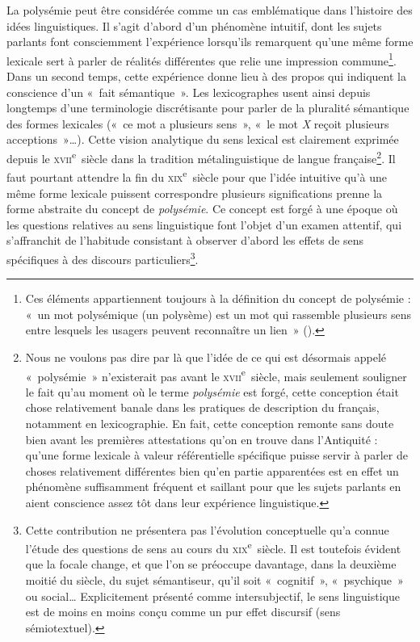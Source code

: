 \documentclass[output=paper]{langsci/langscibook}
\begin{document}
La polysémie peut être considérée comme un cas emblématique dans l’histoire des idées linguistiques. Il s’agit d’abord d’un phénomène intuitif, dont les sujets parlants font consciemment l’expérience lorsqu’ils remarquent qu’une même forme lexicale sert à parler de réalités différentes que relie une impression commune\footnote{ \textrm{Ces éléments appartiennent toujours à la définition du concept de polysémie : «~un mot polysémique (un polysème) est un mot qui rassemble plusieurs sens entre lesquels les usagers peuvent reconnaître un lien~» (\citealt[94]{nyckees_semantique_1998}).}}. Dans un second temps, cette expérience donne lieu à des propos qui indiquent la conscience d’un «~fait sémantique~». Les lexicographes usent ainsi depuis longtemps d’une terminologie discrétisante pour parler de la pluralité sémantique des formes lexicales («~ce mot a plusieurs sens~», «~le mot \textit{X} reçoit plusieurs acceptions~»…). Cette vision analytique du sens lexical est clairement exprimée depuis le \textsc{xvii}\textsuperscript{e}~siècle dans la tradition métalinguistique de langue française\footnote{ \textrm{Nous ne voulons pas dire par là que l’idée de ce qui est désormais appelé «~polysémie~» n’existerait pas avant le} \textrm{\textsc{xvii}}\textrm{\textsuperscript{e}}\textrm{~siècle, mais seulement souligner le fait qu’au moment où le terme} \textrm{\textit{polysémie}} \textrm{est forgé, cette conception était chose relativement banale dans les pratiques de description du français, notamment en lexicographie. En fait, cette conception remonte sans doute bien avant les premières attestations qu’on en trouve dans l’Antiquité : qu’une forme lexicale à valeur référentielle spécifique puisse servir à parler de choses relativement différentes bien qu’en partie apparentées est en effet un phénomène suffisamment fréquent et saillant pour que les sujets parlants en aient conscience assez tôt dans leur expérience linguistique.}}. Il faut pourtant attendre la fin du \textsc{xix}\textsuperscript{e}~siècle pour que l’idée intuitive qu’à une même forme lexicale puissent correspondre plusieurs significations prenne la forme abstraite du concept de \textit{polysémie}. Ce concept est forgé à une époque où les questions relatives au sens linguistique font l’objet d’un examen attentif, qui s’affranchit de l’habitude consistant à observer d’abord les effets de sens spécifiques à des discours particuliers\footnote{ \textrm{Cette contribution ne présentera pas l’évolution conceptuelle qu’a connue l’étude des questions de sens au cours du} \textrm{\textsc{xix}}\textrm{\textsuperscript{e}}\textrm{~siècle. Il est toutefois évident que la focale change, et que l’on se préoccupe davantage, dans la deuxième moitié du siècle, du sujet sémantiseur, qu’il soit «~cognitif~», «~psychique~» ou social… Explicitement présenté comme intersubjectif, le sens linguistique est de moins en moins conçu comme un pur effet discursif (sens sémiotextuel).}}.
\end{document}
